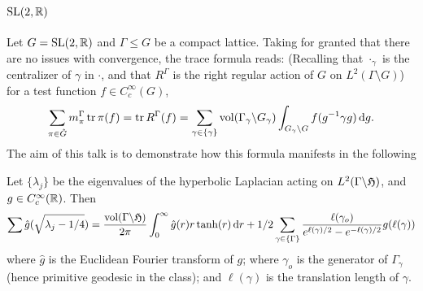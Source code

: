 \documentclass[11pt]{amsart}
\newcommand{\lmod}{\backslash}
\begin{document}
\section{$\operatorname{SL}(2,\mathbb{R})$}
Let $G=\operatorname{SL}(2,\mathbb{R})$ and $\Gamma \leq G$ be a compact lattice. Taking for granted that there are no issues with convergence, the trace formula reads: (Recalling that $\cdot_{\gamma}$ is the centralizer of $\gamma$ in $\cdot$, and that $R^{\Gamma}$ is the right regular action of $G$ on $L^{2}(\Gamma \setminus G)$) for a test function $f\in C_{c}^{\infty}(G)$, 
	\begin{align*}
		\sum_ {\pi \in \hat{G}} m_{\pi}^{\Gamma}\Tr \pi(f)= \Tr R^{\Gamma}(f)= \sum_{\gamma\in \{\gamma\}} \vol (\Gamma_{\gamma} \lmod G_{\gamma}) \int_{G_{\gamma}\lmod G} f(g^{-1}\gamma g) \dop g.
	\end{align*} 
The aim of this talk is to demonstrate how this formula manifests in the following
\begin{thm}
	Let $\{\lambda_{j}\}$ be the eigenvalues of the hyperbolic Laplacian acting on $L^{2}(\Gamma \lmod \half)$, and $g\in C_{c}^{\infty}(\mathbb{R})$. Then
		\begin{align*}
			\sum \hat{g}(\sqrt{\lambda_{j}-1/4}) = \frac{\vol (\Gamma \lmod \half)}{2\pi} \int_{0}^{\infty}\hat{g}(r) r\tanh(r)\dop r +1/2 \sum_{\gamma \in \{\Gamma\}} \frac{\ell(\gamma_{o})}{e^{\ell(\gamma)/2}-e^{-\ell(\gamma)/2}} g(\ell(\gamma))			
		\end{align*}
	where $\hat{g}$ is the Euclidean Fourier transform of $g$; where $\gamma_{o}$ is the generator of $\Gamma_{\gamma}$ (hence primitive geodesic in the class); and $\ell(\gamma)$ is the translation length of $\gamma$.   
\end{thm}
\end{document}
